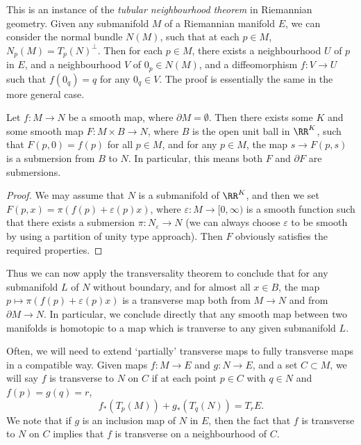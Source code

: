 \begin{remark}
    This is an instance of the \emph{tubular neighbourhood theorem} in Riemannian geometry. Given any submanifold $M$ of a Riemannian manifold $E$, we can consider the normal bundle $N(M)$, such that at each $p \in M$, $N_p(M) = T_p(N)^\perp$. Then for each $p \in M$, there exists a neighbourhood $U$ of $p$ in $E$, and a neighbourhood $V$ of $0_p \in N(M)$, and a diffeomorphism $f: V \to U$ such that $f(0_q) = q$ for any $0_q \in V$. The proof is essentially the same in the more general case.
\end{remark}

\begin{corollary}
    Let $f: M \to N$ be a smooth map, where $\partial M = \emptyset$. Then there exists some $K$ and some smooth map $F: M \times B \to N$, where $B$ is the open unit ball in $\RR^K$, such that $F(p,0) = f(p)$ for all $p \in M$, and for any $p \in M$, the map $s \to F(p,s)$ is a submersion from $B$ to $N$. In particular, this means both $F$ and $\partial F$ are submersions.
\end{corollary}
\begin{proof}
    We may assume that $N$ is a submanifold of $\RR^K$, and then we set $F(p,x) = \pi(f(p) + \varepsilon(p) x)$, where $\varepsilon: M \to [0,\infty)$ is a smooth function such that there exists a submersion $\pi: N_\varepsilon \to N$ (we can always choose $\varepsilon$ to be smooth by using a partition of unity type approach). Then $F$ obviously satisfies the required properties.
\end{proof}

Thus we can now apply the transversality theorem to conclude that for any submanifold $L$ of $N$ without boundary, and for almost all $x \in B$, the map $p \mapsto \pi(f(p) + \varepsilon(p) x)$ is a transverse map both from $M \to N$ and from $\partial M \to N$. In particular, we conclude directly that any smooth map between two manifolds is homotopic to a map which is tranverse to any given submanifold $L$.

Often, we will need to extend `partially' transverse maps to fully transverse maps in a compatible way. Given maps $f: M \to E$ and $g: N \to E$, and a set $C \subset M$, we will say $f$ is transverse to $N$ on $C$ if at each point $p \in C$ with $q \in N$ and $f(p) = g(q) = r$,
%
\[ f_*(T_p(M)) + g_*(T_q(N)) = T_r E. \]
%
We note that if $g$ is an inclusion map of $N$ in $E$, then the fact that $f$ is transverse to $N$ on $C$ implies that $f$ is transverse on a neighbourhood of $C$.

